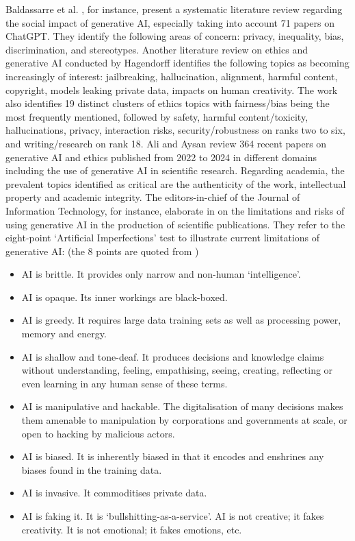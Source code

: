 Baldassarre et al. \cite{baldassarre2023social}, for instance, present a systematic literature review regarding the social impact of generative AI, especially taking into account 71 papers on ChatGPT. They identify the following areas of concern: privacy, inequality, bias, discrimination, and stereotypes. Another literature review on ethics and generative AI conducted by Hagendorff \cite{hagendorff2024mapping} identifies the following topics as becoming increasingly of interest: jailbreaking, hallucination, alignment, harmful content, copyright, models leaking private data, impacts on human creativity. The work also identifies 19 distinct clusters of ethics topics with fairness/bias being the most frequently mentioned, followed by safety, harmful content/toxicity, hallucinations, privacy, interaction risks, security/robustness on ranks two to six, and writing/research on rank 18. 
Ali and Aysan \cite{ali2024ethical} review 364 recent papers on generative AI and ethics published from 2022 to 2024 in different domains including the use of generative AI in scientific research. Regarding academia, the prevalent topics identified as critical are the authenticity of the work, intellectual property and academic integrity. The editors-in-chief of the Journal of Information Technology, for instance, elaborate in \cite{schlagwein2023chatgpt} on the limitations and risks of using generative AI in the production of scientific publications. They refer to the eight-point ‘Artificial Imperfections’ test to illustrate current limitations of generative AI: (the 8 points are quoted from \cite{schlagwein2023chatgpt})
\begin{itemize}
\item	AI is brittle. It provides only narrow and non-human ‘intelligence’.
\item	AI is opaque. Its inner workings are black-boxed.
\item	AI is greedy. It requires large data training sets as well as processing power, memory and energy.
\item	AI is shallow and tone-deaf. It produces decisions and knowledge claims without understanding, feeling, empathising, seeing, creating, reflecting or even learning in any human sense of these terms.
\item	AI is manipulative and hackable. The digitalisation of many decisions makes them amenable to manipulation by corporations and governments at scale, or open to hacking by malicious actors.
\item	AI is biased. It is inherently biased in that it encodes and enshrines any biases found in the training data.
\item	AI is invasive. It commoditises private data.
\item	AI is faking it. It is ‘bullshitting-as-a-service’. AI is not creative; it fakes creativity. It is not emotional; it fakes emotions, etc.
\end{itemize}
